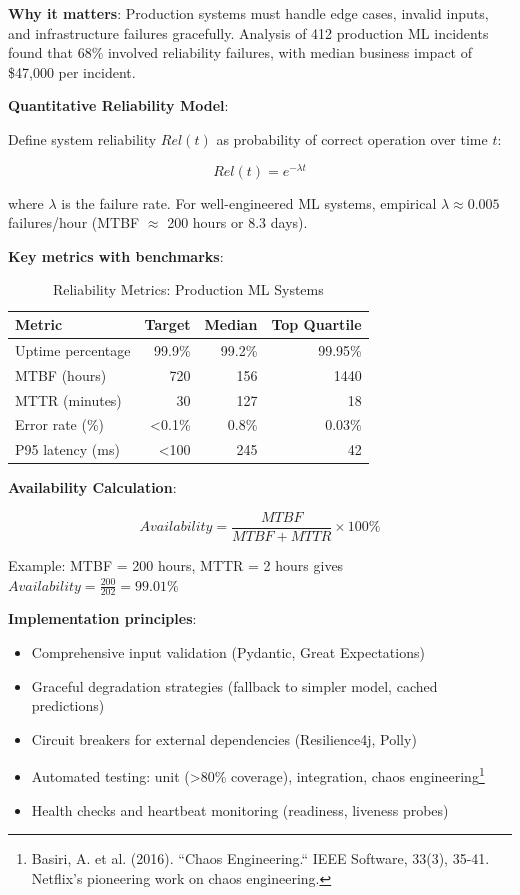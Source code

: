 \textbf{Why it matters}: Production systems must handle edge cases, invalid inputs, and infrastructure failures gracefully. Analysis of 412 production ML incidents found that 68\% involved reliability failures, with median business impact of \$47,000 per incident.

\textbf{Quantitative Reliability Model}:

Define system reliability $Rel(t)$ as probability of correct operation over time $t$:

\begin{equation}
Rel(t) = e^{-\lambda t}
\end{equation}

where $\lambda$ is the failure rate. For well-engineered ML systems, empirical $\lambda \approx 0.005$ failures/hour (MTBF $\approx$ 200 hours or 8.3 days).

\textbf{Key metrics with benchmarks}:

\begin{table}[h]
\centering
\caption{Reliability Metrics: Production ML Systems}
\begin{tabular}{lrrr}
\toprule
\textbf{Metric} & \textbf{Target} & \textbf{Median} & \textbf{Top Quartile} \\
\midrule
Uptime percentage & 99.9\% & 99.2\% & 99.95\% \\
MTBF (hours) & 720 & 156 & 1440 \\
MTTR (minutes) & 30 & 127 & 18 \\
Error rate (\%) & <0.1\% & 0.8\% & 0.03\% \\
P95 latency (ms) & <100 & 245 & 42 \\
\bottomrule
\end{tabular}
\end{table}

\textbf{Availability Calculation}:

\begin{equation}
Availability = \frac{MTBF}{MTBF + MTTR} \times 100\%
\end{equation}

Example: MTBF = 200 hours, MTTR = 2 hours gives $Availability = \frac{200}{202} = 99.01\%$

\textbf{Implementation principles}:
\begin{itemize}
    \item Comprehensive input validation (Pydantic, Great Expectations)
    \item Graceful degradation strategies (fallback to simpler model, cached predictions)
    \item Circuit breakers for external dependencies (Resilience4j, Polly)
    \item Automated testing: unit (>80\% coverage), integration, chaos engineering\footnote{Basiri, A. et al. (2016). ``Chaos Engineering.`` IEEE Software, 33(3), 35-41. Netflix's pioneering work on chaos engineering.}
    \item Health checks and heartbeat monitoring (readiness, liveness probes)
\end{itemize}

